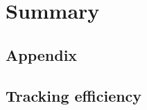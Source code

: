 \documentclass[12pt,a4paper]{report}
\begin{document}
\chapter{Summary}

\begin{appendices}
\chapter{Appendix}
\section{Tracking efficiency}
\label{TrkEffApp}
\end{appendices}



\end{document}
